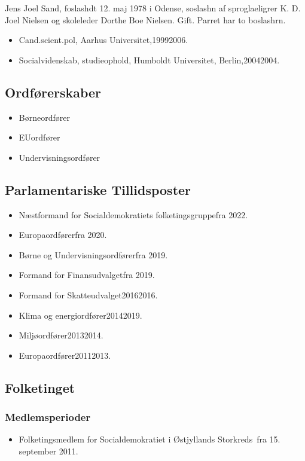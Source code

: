 \documentclass[11pt, a4paper]{awesome-cv}
\begin{document}
\makecvheader[R]
\makelettertitle
\begin{cvletter}
Jens Joel Sand, foslashdt 12. maj 1978 i Odense, soslashn af sproglaeligrer K. D. Joel Nielsen og skoleleder Dorthe Boe Nielsen. Gift. Parret har to boslashrn.

\begin{itemize}
\item Cand.scient.pol, Aarhus Universitet,19992006.
\item Socialvidenskab, studieophold, Humboldt Universitet, Berlin,20042004.
\end{itemize}
\subsection*{Ordførerskaber}
\begin{itemize}
\item Børneordfører
\item EUordfører
\item Undervisningsordfører
\end{itemize}
\subsection*{Parlamentariske Tillidsposter}
\begin{itemize}
\item Næstformand for Socialdemokratiets folketingsgruppefra 2022.
\item Europaordførerfra 2020.
\item Børne og Undervisningsordførerfra 2019.
\item Formand for Finansudvalgetfra 2019.
\item Formand for Skatteudvalget20162016.
\item Klima og energiordfører20142019.
\item Miljøordfører20132014.
\item Europaordfører20112013.
\end{itemize}
\subsection*{Folketinget}
\subsubsection*{Medlemsperioder}
\begin{itemize}
\item Folketingsmedlem for Socialdemokratiet i Østjyllands Storkreds fra 15. september 2011.
\end{itemize}

\end{cvletter}
\end{document}
